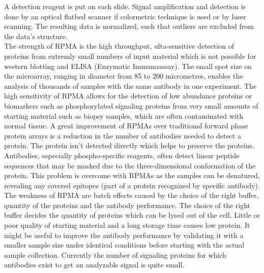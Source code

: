 A detection reagent is put on each slide. Signal amplification and detection is done by an optical flatbed scanner if colormetric technique is used or by laser scanning. The resulting data is normalized, such that outliers are excluded from the data's structure.\\

The strength of RPMA is the high throughput, ulta-sensitive detection of proteins from extremly small numbers of input material which is not possible for western blotting and \gls{ELISA} (Enzymatic Immunoassay). The small spot size on the microarray, ranging in diameter from 85 to 200 micrometres, enables the analysis of thousands of samples with the same antibody in one experiment. The high sensitivity of RPMA allows for the detection of low abundance proteins or biomarkers such as phosphorylated signaling proteins from very small amounts of starting material such as biopsy samples, which are often contaminated with normal tissue. A great improvement of RPMAs over traditional forward phase protein arrays is a reduction in the number of antibodies needed to detect a protein. The protein isn't detected directly which helps to preserve the proteins. Antibodies, especially phospho-specific reagents, often detect linear peptide sequences that may be masked due to the three-dimensional conformation of the protein. This problem is overcome with RPMAs as the samples can be denatured, revealing any covered epitopes (part of a protein recognized by specific antibody).\\

The weakness of RPMA are batch effects caused by the choice of the right buffer, quantity of the proteins and the antibody performance.
The choice of the right buffer decides the quantity of proteins which can be lysed out of the cell. Little or poor quality of starting material and a long storage time causes low protein. It might be useful to improve the antibody performance by validating it with a smaller sample size under identical conditions before starting with the actual sample collection. Currently the number of signaling proteins for which antibodies exist to get an analyzable signal is quite small. \\



\newpage
